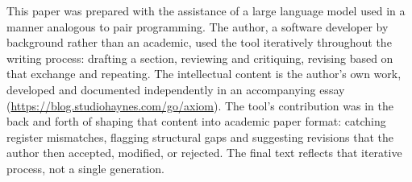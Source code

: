 \documentclass[11pt, letterpaper]{article}
\begin{document}
This paper was prepared with the assistance of a large language model used in a manner analogous to pair programming. The author, a software developer by background rather than an academic, used the tool iteratively throughout the writing process: drafting a section, reviewing and critiquing, revising based on that exchange and repeating. The intellectual content is the author's own work, developed and documented independently in an accompanying essay (\url{https://blog.studiohaynes.com/go/axiom}). The tool's contribution was in the back and forth of shaping that content into academic paper format: catching register mismatches, flagging structural gaps and suggesting revisions that the author then accepted, modified, or rejected. The final text reflects that iterative process, not a single generation.

\end{document}
